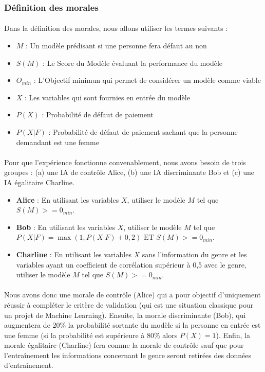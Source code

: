 \documentclass[10pt, french, a4paper]{report}
\begin{document}
\subsubsection{Définition des morales}

\paragraph{}
Dans la définition des morales, nous allons utiliser les termes suivants :

\begin{itemize}
  \item $M$ : Un modèle prédisant si une personne fera défaut au non
  \item $S(M)$ : Le Score du Modèle évaluant la performance du modèle
  \item $O_{min}$ : L'Objectif minimun qui permet de considérer un modèle comme viable
  \item $X$ : Les variables qui sont fournies en entrée du modèle
  \item $P(X)$ : Probabilité de défaut de paiement
  \item $P(X | F)$ : Probabilité de défaut de paiement sachant que la personne demandant est une femme
\end{itemize}

\paragraph{}
Pour que l'expérience fonctionne convenablement, nous avons besoin de trois groupes : (a) une IA de contrôle Alice, (b) une IA discriminante Bob et (c) une IA égalitaire Charline.

\begin{itemize}
  \item \textbf{Alice} : En utilisant les variables $X$, utiliser le modèle $M$ tel que $S(M) >= 0_{min}$.
  \item \textbf{Bob} :  En utilisant les variables $X$, utiliser le modèle $M$ tel que $P(X|F) = \max(1, P(X|F) + 0,2) \text{ ET } S(M) >= 0_{min}$.
  \item \textbf{Charline} : En utilisant les variables $X$ sans l'information du genre et les variables ayant un coefficient de corrélation supérieur à 0,5 avec le genre, utiliser le modèle $M$ tel que $S(M) >= 0_{min}$.
\end{itemize}

\paragraph{}
Nous avons donc une morale de contrôle (Alice) qui a pour objectif d'uniquement réussir à compléter le critère de validation (qui est une situation classique pour un projet de Machine Learning). Ensuite, la morale discriminante (Bob), qui augmentera de 20\% la probabilité sortante du modèle si la personne en entrée est une femme (si la probabilité est supérieure à 80\% alors $P(X) = 1$). Enfin, la morale égalitaire (Charline) fera comme la morale de contrôle sauf que pour l'entraînement les informations concernant le genre seront retirées des données d'entraînement.
\end{document}

